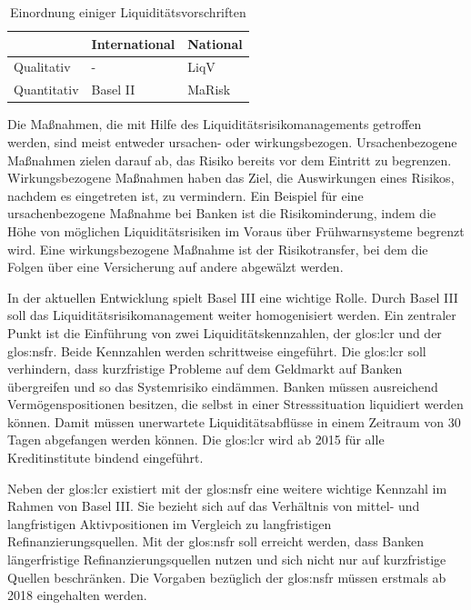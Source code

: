 \begin{onehalfspacing}
{
\setlength{\extrarowheight}{2pt}
\begin{table}[ht]
\centering
\begin{tabular}{| l | >{\centering\arraybackslash} m{4cm} | >{\centering\arraybackslash} m{4cm} |}
\cline{2-3}
\multicolumn{1}{l|}{}	& International & National 		\\	\hline
Qualitativ 				& - 			& \gls{LiqV}	\\	\hline
Quantitativ 			& Basel II 		& \gls{MaRisk}	\\	\hline
\end{tabular} 
\caption{Einordnung einiger Liquiditätsvorschriften \label{table:einordnung}}
\end{table}
}

Die Maßnahmen, die mit Hilfe des Liquiditätsrisikomanagements getroffen werden, sind meist entweder ursachen- oder wirkungsbezogen. Ursachenbezogene Maßnahmen zielen darauf ab, das Risiko bereits vor dem Eintritt zu begrenzen. Wirkungsbezogene Maßnahmen haben das Ziel, die Auswirkungen eines Risikos, nachdem es eingetreten ist, zu vermindern. Ein Beispiel für eine ursachenbezogene Maßnahme bei Banken ist die Risikominderung, indem die Höhe von möglichen Liquiditätsrisiken im Voraus über Frühwarnsysteme begrenzt wird. Eine wirkungsbezogene Maßnahme ist der Risikotransfer, bei dem die Folgen über eine Versicherung auf andere abgewälzt werden.


In der aktuellen Entwicklung spielt Basel III eine wichtige Rolle. Durch Basel III soll das Liquiditätsrisikomanagement weiter homogenisiert werden. Ein zentraler Punkt ist die Einführung von zwei Liquiditätskennzahlen, der \gls{glos:lcr} und der \gls{glos:nsfr}. Beide Kennzahlen werden schrittweise eingeführt. Die \gls{glos:lcr} soll verhindern, dass kurzfristige Probleme auf dem Geldmarkt auf Banken übergreifen und so das Systemrisiko eindämmen. Banken müssen ausreichend Vermögenspositionen besitzen, die selbst in einer Stresssituation liquidiert werden können. Damit müssen unerwartete Liquiditätsabflüsse in einem Zeitraum von 30 Tagen abgefangen werden können. Die \gls{glos:lcr} wird ab 2015 für alle Kreditinstitute bindend eingeführt.

Neben der \gls{glos:lcr} existiert mit der \gls{glos:nsfr} eine weitere wichtige Kennzahl im Rahmen von Basel III. Sie bezieht sich auf das Verhältnis von mittel- und langfristigen Aktivpositionen im Vergleich zu langfristigen Refinanzierungsquellen. Mit der \gls{glos:nsfr} soll erreicht werden, dass Banken längerfristige Refinanzierungsquellen nutzen und sich nicht nur auf kurzfristige Quellen beschränken. Die Vorgaben bezüglich der \gls{glos:nsfr} müssen erstmals ab 2018 eingehalten werden.


\end{onehalfspacing}

